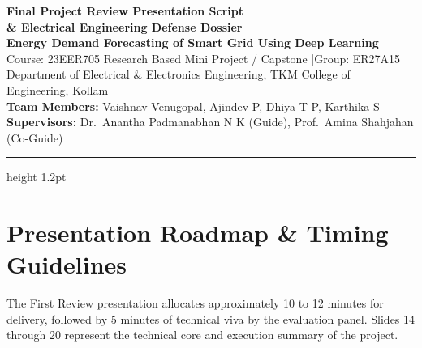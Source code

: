 \documentclass[11pt,a4paper]{article}
\begin{document}
\begin{center}
    {\LARGE\bfseries\color{primaryblue} Final Project Review Presentation Script}\\[4pt]
    {\large\bfseries\color{secondaryblue} \& Electrical Engineering Defense Dossier}\\[6pt]
    {\normalsize\textbf{Energy Demand Forecasting of Smart Grid Using Deep Learning}}\\[8pt]
    \textsf{\small Course: 23EER705 Research Based Mini Project / Capstone \quad|\quad Group: ER27A15}\\[2pt]
    \textsf{\small Department of Electrical \& Electronics Engineering, TKM College of Engineering, Kollam}\\[4pt]
    \textsf{\footnotesize \textbf{Team Members:} Vaishnav Venugopal, Ajindev P, Dhiya T P, Karthika S}\\[1pt]
    \textsf{\footnotesize \textbf{Supervisors:} Dr.~Anantha Padmanabhan N K (Guide), Prof.~Amina Shahjahan (Co-Guide)}
\end{center}
\vspace{0.3cm}
\hrule height 1.2pt
\vspace{0.4cm}

\section{Presentation Roadmap \& Timing Guidelines}

The First Review presentation allocates approximately 10 to 12 minutes for delivery, followed by 5 minutes of technical viva by the evaluation panel. Slides 14 through 20 represent the technical core and execution summary of the project.
\end{document}
